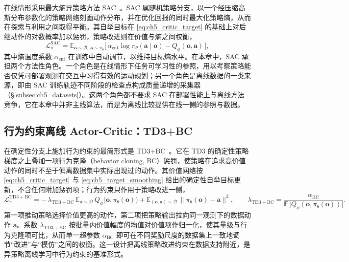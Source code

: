在线情形采用最大熵异策略方法 SAC~\citep{haarnoja2018sac}。SAC 属随机策略分支，以一个经压缩高斯分布参数化的策略网络刻画动作分布，并在优化回报的同时最大化策略熵，从而在探索与利用之间取得平衡。其自举目标在 \eqref{eq:ch5_critic_target} 的基础上对后继动作的对数概率加以惩罚，策略改进则在价值与熵之间权衡，
\begin{equation}
\mathcal{L}_{\pi}^{\mathrm{SAC}}
= \mathbb{E}_{\mathbf{o}\sim\mathcal{B},\ \mathbf{a}\sim\pi_\theta}
\big[\,\alpha_{\mathrm{ent}}\log\pi_\theta(\mathbf{a}\mid\mathbf{o}) - Q_\phi(\mathbf{o},\mathbf{a})\,\big],
\label{eq:ch5_sac_actor}
\end{equation}
其中熵温度系数 $\alpha_{\mathrm{ent}}$ 在训练中自动调节，以维持目标熵水平。在本章中，SAC 承担两个方法性角色。一个角色是在线情形下任务可学习性的参照，用以考察策略能否仅凭可部署观测在交互中习得有效的运动规划；另一个角色是离线数据的一类来源，即由 SAC 训练轨迹不同阶段的检查点构成质量递增的采集器（\S\ref{subsec:ch5_datasets}）。这两个角色都不要求 SAC 在部署性能上与离线方法竞争，它在本章中并非主线算法，而是为离线比较提供在线一侧的参照与数据。

\subsection{行为约束离线 Actor-Critic：TD3+BC}\label{subsec:ch5_method_td3bc}

在确定性分支上施加行为约束的最简形式是 TD3+BC~\citep{fujimoto2021td3bc}。它在 TD3 的确定性策略梯度之上叠加一项行为克隆（behavior cloning, BC）惩罚，使策略在追求高价值动作的同时不至于偏离数据集中实际出现过的动作。其价值网络按 \eqref{eq:ch5_critic_target} 与 \eqref{eq:ch5_target_smoothing} 给出的确定性自举目标更新，不含任何附加惩罚项；行为约束只作用于策略改进一侧，
\begin{equation}
\mathcal{L}_{\pi}^{\mathrm{TD3{+}BC}}
= -\,\lambda_{\mathrm{TD3{+}BC}}\,
\mathbb{E}_{\mathbf{o}\sim\mathcal{D}}\,Q_\phi\big(\mathbf{o},\pi_\theta(\mathbf{o})\big)
+ \mathbb{E}_{(\mathbf{o},\mathbf{a})\sim\mathcal{D}}\,\big\|\pi_\theta(\mathbf{o}) - \mathbf{a}\big\|^2,
\qquad
\lambda_{\mathrm{TD3{+}BC}}
= \frac{\alpha_{\mathrm{BC}}}{\mathbb{E}\,\big|Q_\phi(\mathbf{o},\pi_\theta(\mathbf{o}))\big|}.
\label{eq:ch5_td3bc_actor}
\end{equation}
第一项推动策略选择价值更高的动作，第二项把策略输出拉向同一观测下的数据动作 $\mathbf{a}$。系数 $\lambda_{\mathrm{TD3{+}BC}}$ 按批量内价值幅度的均值对价值项作归一化，使其量级与行为克隆项可比，从而单一超参数 $\alpha_{\mathrm{BC}}$ 即可在不同奖励尺度的数据集上一致地调节“改进”与“模仿”之间的权衡。这一设计把离线策略改进约束在数据支持附近，是异策略离线学习中行为约束的基准形式。

